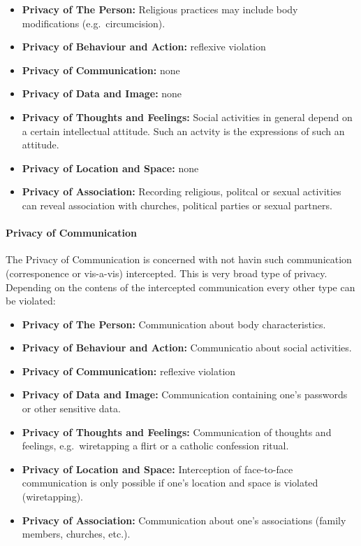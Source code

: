 \begin{itemize}

\item
  \textbf{Privacy of The Person:} Religious practices may include body
  modifications (e.g.~circumcision).
\item
  \textbf{Privacy of Behaviour and Action:} reflexive violation
\item
  \textbf{Privacy of Communication:} none
\item
  \textbf{Privacy of Data and Image:} none
\item
  \textbf{Privacy of Thoughts and Feelings:} Social activities in
  general depend on a certain intellectual attitude. Such an actvity is
  the expressions of such an attitude.
\item
  \textbf{Privacy of Location and Space:} none
\item
  \textbf{Privacy of Association:} Recording religious, politcal or
  sexual activities can reveal association with churches, political
  parties or sexual partners.
\end{itemize}

\paragraph*{Privacy of Communication}

The Privacy of Communication is concerned with not havin such
communication (corresponence or vis-a-vis) intercepted. This is very
broad type of privacy. Depending on the contens of the intercepted
communication every other type can be violated:

\begin{itemize}

\item
  \textbf{Privacy of The Person:} Communication about body
  characteristics.
\item
  \textbf{Privacy of Behaviour and Action:} Communicatio about social
  activities.
\item
  \textbf{Privacy of Communication:} reflexive violation
\item
  \textbf{Privacy of Data and Image:} Communication containing one's
  passwords or other sensitive data.
\item
  \textbf{Privacy of Thoughts and Feelings:} Communication of thoughts
  and feelings, e.g.~wiretapping a flirt or a catholic confession
  ritual.
\item
  \textbf{Privacy of Location and Space:} Interception of face-to-face
  communication is only possible if one's location and space is violated
  (wiretapping).
\item
  \textbf{Privacy of Association:} Communication about one's
  associations (family members, churches, etc.).
\end{itemize}

